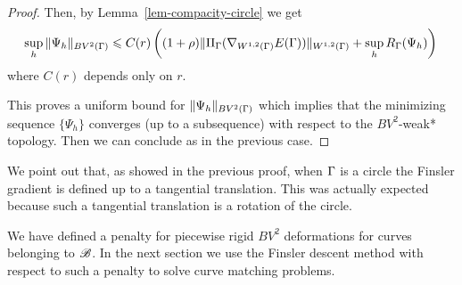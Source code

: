 \begin{proof}
Then, by Lemma~\ref{lem-compacity-circle} we get
$$	 \underset{h}{\sup}\,	\|  \Psi_h  \|_{BV^{2}(\Gamma)} \leqslant 
		C(r)\left( (1+\rho) \|\Pi_\Gamma(\nabla_{W^{1,2}(\Gamma)}E(\Gamma))\|_{W^{1,2}(\Gamma)} +
\underset{h}{\sup}\,R_\Gamma(\Psi_h)\right)\,
$$ 
where $C(r)$ depends only on $r$.


This proves a uniform bound for  $\|\Psi_h\|_{BV^2(\Gamma)}$ which implies that the minimizing sequence $\{\Psi_h\}$ converges (up to a subsequence) with respect to the $BV^2$-weak* topology.  Then we can conclude as in the previous case.
\end{proof}

We point out that, as showed in the previous proof, when $\Gamma$ is a circle the Finsler gradient is defined up to a tangential translation. This was actually expected because such a tangential translation is a rotation of the circle.
 
We have defined a penalty for piecewise rigid $BV^2$ deformations for curves belonging to $\mathcal{B}$. In the next section we use the Finsler descent method with respect to such a penalty to solve curve matching problems.

